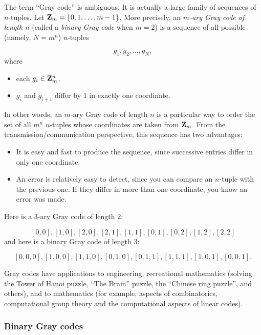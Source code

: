 The term ``Gray code'' is ambiguous. It is actually a
large family of sequences of $n$-tuples. Let
$\mathbf{Z}_m=\{0,1,\dots,m-1\}$. More precisely, an
{\it $m$-ary Gray code of length $n$} (called a {\it binary
Gray code} when $m=2$) is a sequence of
all possible (namely, $N=m^n$) $n$-tuples

\[
g_1,g_2,\dots, g_N,
\]
where
\begin{itemize}
\item
each $g_i\in \mathbf{Z}_m^n$,
\item
$g_i$ and $g_{i+1}$ differ by $1$ in exactly one
coordinate.
\end{itemize}
In other words, an $m$-ary Gray code of length
$n$ is a particular way to order the set of all
$m^n$ $n$-tuples whose coordinates are taken from
$\mathbf{Z}_m$. From the transmission/communication
perspective, this sequence has two advantages:

\begin{itemize}
\item
It is easy and fast to produce the sequence, since
successive entries differ in only one coordinate.

\item
An error is relatively easy to detect, since you can
compare an $n$-tuple with the previous one. If they
differ in more than one coordinate, you know an error
was made.

\end{itemize}

\begin{example}
{\rm
Here is a $3$-ary Gray code of length $2$:

\[
[0, 0], [1, 0], [2, 0], [2, 1], [1, 1], [0, 1], [0, 2], [1, 2], [2, 2]
\]
and here is a binary Gray code of length $3$:

\[
[0, 0, 0], [1, 0, 0], [1, 1, 0], [0, 1, 0], [0, 1, 1], [1, 1, 1], [1, 0, 1], [0, 0, 1].
\]
}
\end{example}

Gray codes have applications to engineering,
recreational mathematics (solving the Tower of Hanoi
puzzle, ``The Brain'' puzzle, the ``Chinese ring puzzle'',
and others), and to mathematics (for example, aspects of
combinatorics, computational group theory
and the computational aspects of linear codes).

\subsubsection{Binary Gray codes}


